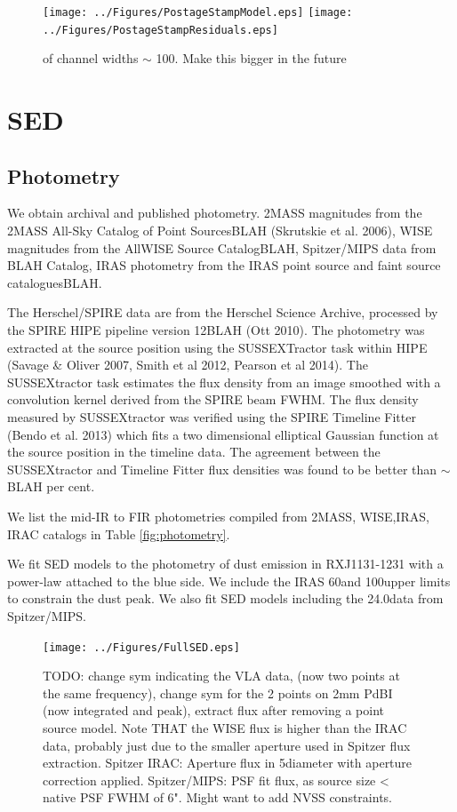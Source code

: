 \begin{figure}[tbph]
\centering
\texttt{[image: ../Figures/PostageStampModel.eps]}
\texttt{[image: ../Figures/PostageStampResiduals.eps]}
\caption{
of channel widths $\sim$ 100\kms.
Make this bigger in the future
\label{fig:}}
\end{figure}


\section{SED}

\subsection{Photometry}

We obtain archival and published photometry.
2MASS magnitudes from the 2MASS All-Sky
Catalog of Point SourcesBLAH  (Skrutskie et al. 2006), WISE magnitudes
from the AllWISE Source CatalogBLAH, Spitzer/MIPS
data from BLAH Catalog, IRAS photometry from the IRAS point source
and faint source cataloguesBLAH.

The Herschel/SPIRE data are from the Herschel Science Archive, processed
by the SPIRE HIPE pipeline version 12BLAH (Ott 2010). The
photometry was extracted at the source position using the
SUSSEXTractor task within HIPE (Savage \& Oliver 2007,
Smith et al 2012, Pearson et al 2014). The SUSSEXtractor
task estimates the flux density from an image smoothed with
a convolution kernel derived from the SPIRE beam FWHM.
The flux density measured by SUSSEXtractor
was verified using the SPIRE Timeline Fitter (Bendo et
al. 2013) which fits a two dimensional elliptical Gaussian
function at the source position in the timeline data. The
agreement between the SUSSEXtractor and Timeline Fitter
flux densities was found to be better than $\sim$BLAH per cent.

We list the mid-IR to FIR photometries compiled from 2MASS, WISE,IRAS, IRAC catalogs in Table \ref{fig:photometry}.

We fit SED models to the photometry of dust emission in RXJ1131-1231 with a power-law attached to the blue side.
We include the IRAS 60\micron and 100\micron upper limits to constrain the dust peak.
We also fit SED models including the 24.0\micron data from Spitzer/MIPS. 


\begin{figure}[tbph]
\centering
\texttt{[image: ../Figures/FullSED.eps]}
\caption{TODO: change sym indicating the VLA data, (now two points at the same frequency), change sym for the 2 points on 
2mm
PdBI (now integrated and peak), extract flux after removing a point source model.
Note THAT the WISE flux is higher than the IRAC data, probably just due to the smaller aperture used in Spitzer flux 
extraction.
Spitzer IRAC: Aperture flux in 5\farcs diameter with aperture correction applied. Spitzer/MIPS: PSF fit flux, as source size < 
native PSF
FWHM of 6".
Might want to add NVSS constraints.
 \label{fig:}}
\end{figure}

